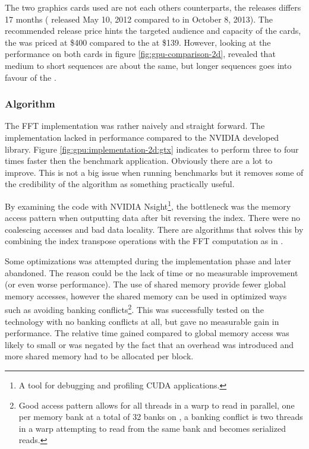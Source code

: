 The two graphics cards used are not each others counterparts, the releases differs 17 months ({\NVCARD} released May 10, 2012 compared to {\AMDCARD} in October 8, 2013). The recommended release price hints the targeted audience and capacity of the cards, the {\NVCARD} was priced at \$400 compared to the {\AMDCARD} at \$139. However, looking at the {\OCL} performance on both cards in figure \ref{fig:gpu-comparison-2d}, revealed that medium to short sequences are about the same, but longer sequences goes into favour of the {\NVCARD}.

\subsubsection{Algorithm}

The \gls{FFT} implementation was rather naively and straight forward. The implementation lacked in performance compared to the NVIDIA developed {\CUFFT} library. Figure \ref{fig:gpu:implementation-2d:gtx} indicates {\CUFFT} to perform three to four times faster then the benchmark application. Obviously there are a lot to improve. This is not a big issue when running benchmarks but it removes some of the credibility of the algorithm as something practically useful.

By examining the code with NVIDIA Nsight\footnote{A tool for debugging and profiling CUDA applications.}, the bottleneck was the memory access pattern when outputting data after bit reversing the index. There were no coalescing accesses and bad data locality. There are algorithms that solves this by combining the index transpose operations with the FFT computation as in \cite{govindaraju2008high}.

Some optimizations was attempted during the implementation phase and later abandoned. The reason could be the lack of time or no measurable improvement (or even worse performance). The use of shared memory provide fewer global memory accesses, however the shared memory can be used in optimized ways such as avoiding banking conflicts\footnote{Good access pattern allows for all threads in a warp to read in parallel, one per memory bank at a total of 32 banks on {\NVCARD}, a banking conflict is two threads in a warp attempting to read from the same bank and becomes serialized reads.}. This was successfully tested on the {\CU} technology with no banking conflicts at all, but gave no measurable gain in performance. The relative time gained compared to global memory access was likely to small or was negated by the fact that an overhead was introduced and more shared memory had to be allocated per block.

